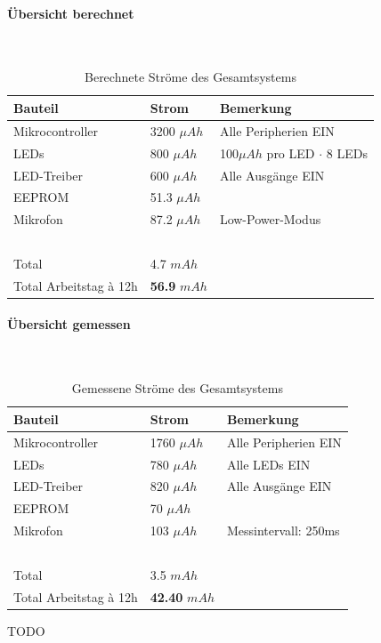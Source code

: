 \documentclass[12pt]{article}
\begin{document}
	\paragraph{Übersicht berechnet}\mbox{}\\
	\begin{table}[H] 
		\centering
		\begin{tabular}{|l|l|l|}
			\hline
			\textbf{Bauteil} & \textbf{Strom} & \textbf{Bemerkung} \\ \hline
			Mikrocontroller & 3200 $\mu Ah$ & Alle Peripherien EIN \\ \hline
			LEDs & 800 $\mu Ah$ & 100$\mu Ah$ pro LED $\cdot$ 8 LEDs \\ \hline
			LED-Treiber & 600 $\mu Ah$ & Alle Ausgänge EIN \\ \hline
			EEPROM & 51.3 $\mu Ah$ & ~ \\ \hline
			Mikrofon & 87.2 $\mu Ah$ & Low-Power-Modus \\ \hline
			~ & ~ & ~ \\ \hline
			Total & 4.7 $mAh$ & ~ \\ \hline
			Total Arbeitstag à 12h & \textbf{56.9} $mAh$ & ~ \\ \hline
		\end{tabular}
		\caption{Berechnete Ströme des Gesamtsystems}
		\label{tab:leistung-berechnet}
	\end{table}
	\paragraph{Übersicht gemessen}\mbox{}\\
		\begin{table}[H] 
			\centering
			\begin{tabular}{|l|l|l|}
			\hline
			\textbf{Bauteil} & \textbf{Strom} & \textbf{Bemerkung} \\ \hline
			Mikrocontroller & 1760 $\mu Ah$ & Alle Peripherien EIN \\ \hline
			LEDs & 780 $\mu Ah$ & Alle LEDs EIN\\ \hline
			LED-Treiber & 820 $\mu Ah$ & Alle Ausgänge EIN \\ \hline
			EEPROM & 70 $\mu Ah$ & ~ \\ \hline
			Mikrofon & 103 $\mu Ah$ & Messintervall: 250ms \\ \hline
			~ & ~ & ~ \\ \hline
			Total & 3.5 $mAh$ & ~ \\ \hline
			Total Arbeitstag à 12h & \textbf{42.40} $mAh$ & ~ \\ \hline
		\end{tabular}
		\caption{Gemessene Ströme des Gesamtsystems}
		\label{tab:leistung-gemessen}
		\end{table}
	\color{red}TODO\color{black}
\end{document}
